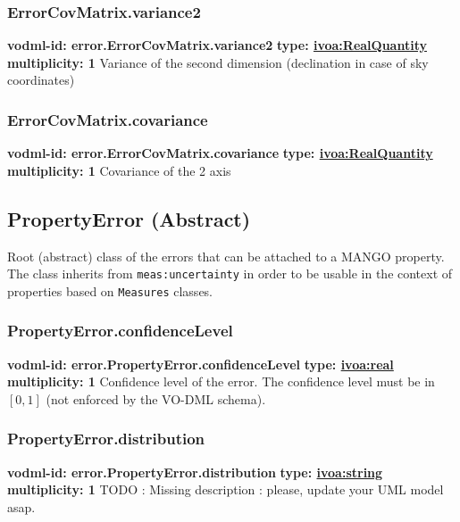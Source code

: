     \subsubsection{ErrorCovMatrix.variance2}
      \textbf{vodml-id: error.ErrorCovMatrix.variance2} \newline
      \textbf{type: \hyperref[sect:ivoa]{ivoa:RealQuantity}} \newline
      \textbf{multiplicity: 1} \newline
      Variance of the second dimension (declination in case of sky coordinates)

    \subsubsection{ErrorCovMatrix.covariance}
      \textbf{vodml-id: error.ErrorCovMatrix.covariance} \newline
      \textbf{type: \hyperref[sect:ivoa]{ivoa:RealQuantity}} \newline
      \textbf{multiplicity: 1} \newline
      Covariance of the 2 axis

  \subsection{PropertyError (Abstract)}
  \label{sect:error.PropertyError}
    Root (abstract) class of the errors that can be attached to a MANGO property. The class inherits from \texttt{meas:uncertainty} in order to be usable in the context of properties based on \texttt{Measures} classes.

    \subsubsection{PropertyError.confidenceLevel}
      \textbf{vodml-id: error.PropertyError.confidenceLevel} \newline
      \textbf{type: \hyperref[sect:ivoa]{ivoa:real}} \newline
      \textbf{multiplicity: 1} \newline
      Confidence level of the error. The confidence level must be in $[0, 1]$ (not enforced by the VO-DML schema).

    \subsubsection{PropertyError.distribution}
      \textbf{vodml-id: error.PropertyError.distribution} \newline
      \textbf{type: \hyperref[sect:ivoa]{ivoa:string}} \newline
      \textbf{multiplicity: 1} \newline
      TODO : Missing description : please, update your UML model asap.

